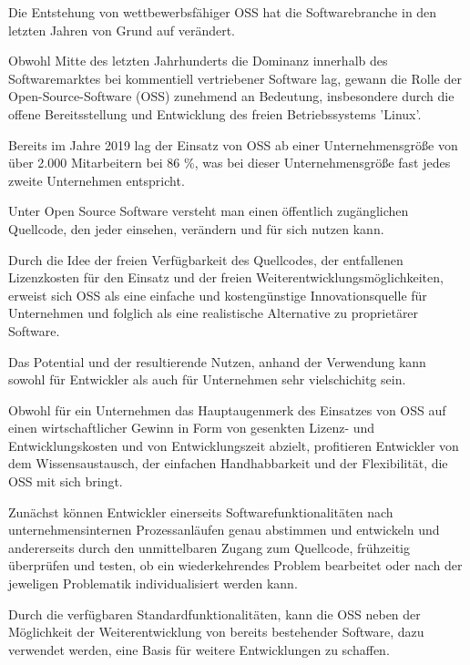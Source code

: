 Die Entstehung von wettbewerbsfähiger OSS hat die Softwarebranche in den letzten Jahren von Grund auf verändert. \cite[S. 185]{bitzer_entwicklung_2007} \cite{fitzgerald_transformation_2006}

Obwohl Mitte des letzten Jahrhunderts die Dominanz innerhalb des Softwaremarktes bei kommentiell vertriebener Software lag, gewann die Rolle der Open-Source-Software (OSS) zunehmend an Bedeutung, insbesondere durch die offene Bereitsstellung und Entwicklung des freien Betriebssystems 'Linux'. \cite[S. 1]{will_open-source-software_2003} 

Bereits im Jahre 2019 lag der Einsatz von OSS ab einer Unternehmensgröße von über 2.000 Mitarbeitern bei 86 \%, was bei dieser Unternehmensgröße fast jedes zweite Unternehmen entspricht. \cite[S. 15]{bitkom_ev_open_2016} 

Unter Open Source Software versteht man einen öffentlich zugänglichen Quellcode, den jeder einsehen, verändern und für sich nutzen kann.

Durch die Idee der freien Verfügbarkeit des Quellcodes, der entfallenen Lizenzkosten für den Einsatz und der freien Weiterentwicklungsmöglichkeiten, erweist sich OSS als eine einfache und kostengünstige Innovationsquelle für Unternehmen und folglich als eine realistische Alternative zu proprietärer Software. \cite[S. 21,22]{allmann_open_2019} 

Das Potential und der resultierende Nutzen, anhand der Verwendung kann sowohl für Entwickler als auch für Unternehmen sehr vielschichitg sein. 

Obwohl für ein Unternehmen das Hauptaugenmerk des Einsatzes von OSS auf einen wirtschaftlicher Gewinn in Form von gesenkten Lizenz- und Entwicklungskosten und von Entwicklungszeit abzielt, profitieren Entwickler von dem Wissensaustausch, der einfachen Handhabbarkeit und der Flexibilität, die OSS mit sich bringt.  

Zunächst können Entwickler einerseits Softwarefunktionalitäten nach unternehmensinternen Prozessanläufen genau abstimmen und entwickeln und andererseits durch den unmittelbaren Zugang zum Quellcode, frühzeitig überprüfen und testen, ob ein wiederkehrendes Problem bearbeitet oder nach der jeweligen Problematik individualisiert werden kann.

Durch die verfügbaren Standardfunktionalitäten, kann die OSS neben der Möglichkeit der Weiterentwicklung von bereits bestehender Software, dazu verwendet werden, eine Basis für weitere Entwicklungen zu schaffen. 

